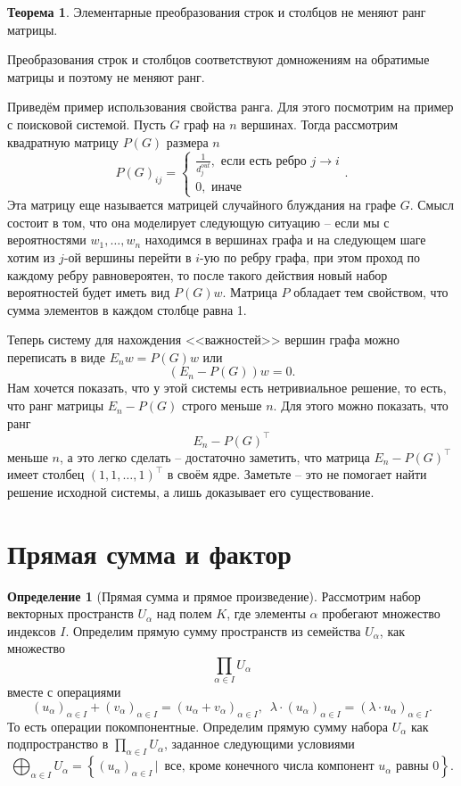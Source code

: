 \documentclass[10pt,a4paper,oneside]{book} %
\theoremstyle{definition}
\newtheorem*{defn}{Определение}
\newtheorem{thm}{Теорема}
\def\thrm{\begin{thm}}
\def\ethrm{\end{thm}}
\def\dfn{\begin{defn}}
\def\edfn{\end{defn}}
\begin{document}
\thrm
Элементарные преобразования строк и столбцов не меняют ранг матрицы.

\ethrm
\proof Преобразования строк и столбцов соответствуют домножениям на обратимые матрицы и поэтому не меняют ранг.  
\endproof

Приведём пример использования свойства ранга. Для этого посмотрим на пример с поисковой системой. Пусть $G$ граф на $n$ вершинах. Тогда рассмотрим квадратную матрицу $P(G)$ размера $n$
$$P(G)_{ij}= \begin{cases} \frac{1}{d_j^{out}}, \text{ если есть ребро $j \to i$} \\
0, \text{ иначе }
\end{cases}.$$
Эта матрицу еще называется матрицей случайного блуждания на графе $G$. Смысл состоит в том, что она моделирует следующую ситуацию -- если мы с вероятностями $w_1,\dots,w_n$ находимся в вершинах графа и на следующем шаге хотим из $j$-ой вершины перейти в $i$-ую по ребру графа, при этом проход по каждому ребру равновероятен, то после такого действия новый набор вероятностей будет иметь вид $P(G)w$. Матрица $P$ обладает тем свойством, что сумма элементов в каждом столбце равна 1. 

Теперь систему для нахождения <<важностей>> вершин графа можно переписать в виде $E_n w= P(G)w$ или 
$$(E_n - P(G))w=0.$$
Нам хочется показать, что у этой системы есть нетривиальное решение, то есть, что ранг матрицы $E_n- P(G)$ строго меньше $n$. Для этого можно показать, что ранг 
$$E_n - P(G)^{\top}$$
меньше $n$, а это легко сделать -- достаточно заметить, что матрица $E_n - P(G)^{\top}$  имеет столбец $(1,1,\dots, 1)^{\top}$ в своём ядре. Заметьте -- это не помогает найти решение исходной системы, а лишь доказывает его существование.






\section{Прямая сумма и фактор}

\dfn[Прямая сумма и прямое произведение] Рассмотрим набор векторных пространств $U_{\alpha}$ над полем $K$,  где элементы $\alpha$ пробегают множество индексов $I$. Определим прямую сумму пространств из семейства $U_{\alpha}$, как множество
$$\prod_{\alpha \in I} U_{\alpha}$$
вместе с операциями $$(u_{\alpha})_{\alpha\in I}+ (v_{\alpha})_{\alpha\in I}=(u_{\alpha}+v_{\alpha})_{\alpha\in I},\,\,\, \lambda \cdot (u_{\alpha})_{\alpha\in I}= (\lambda \cdot u_{\alpha})_{\alpha\in I}.$$
То есть операции покомпонентные. Определим прямую сумму набора $U_{\alpha}$ как подпространство в $\prod_{\alpha \in I} U_{\alpha}$, заданное следующими условиями
$$\bigoplus_{\alpha \in I } U_{\alpha}=\left\{ (u_{\alpha})_{\alpha \in I} \,|\, \text{ все, кроме конечного числа компонент $u_{\alpha}$ равны 0}\right\}.$$
\edfn
\end{document}
